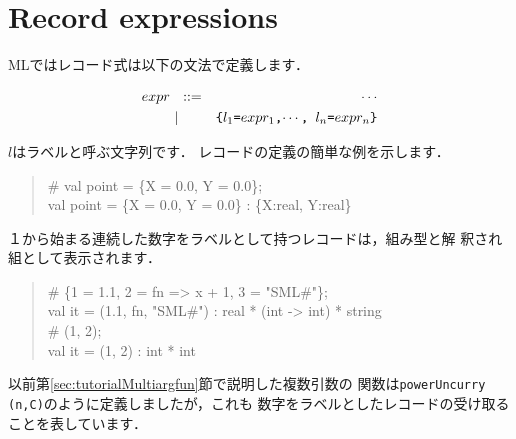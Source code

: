 \documentclass{jbook}
\newcommand{\txt}[2]{#2}
\newcommand{\vbar}{\mbox{\ $|$\ }}
\begin{document}
\section{\txt{レコード構文}{Record expressions}}
\label{sec:extensionRecordExpression}

\ifjp%
	MLではレコード式は以下の文法で定義します．
\begin{tt}
\begin{eqnarray*}
expr &\mbox{\ \ }::=& \cdots \\
     &\vbar& \mbox{\tt \{$l_1$=$expr_1$,$\cdots$, $l_n$=$expr_n$\}}
\end{eqnarray*}
\end{tt}
	$l$はラベルと呼ぶ文字列です．
	レコードの定義の簡単な例を示します．
\begin{tt}
\begin{quote}
\# val point = \{X = 0.0, Y = 0.0\};\\
val point = \{X = 0.0, Y = 0.0\} : \{X:real, Y:real\}
\end{quote}
\end{tt}
	１から始まる連続した数字をラベルとして持つレコードは，組み型と解
釈され組として表示されます．
\begin{tt}
\begin{quote}
\#  \{1 = 1.1, 2 = fn => x + 1, 3 = "SML\#"\};\\
val it = (1.1, fn, "SML\#") : real * (int -> int) * string\\
\# (1, 2);\\
val it = (1, 2) : int * int
\end{quote}
\end{tt}
	以前第\ref{sec:tutorialMultiargfun}節で説明した複数引数の
関数は{\tt powerUncurry (n,C)}のように定義しましたが，これも
数字をラベルとしたレコードの受け取ることを表しています．
\end{document}
